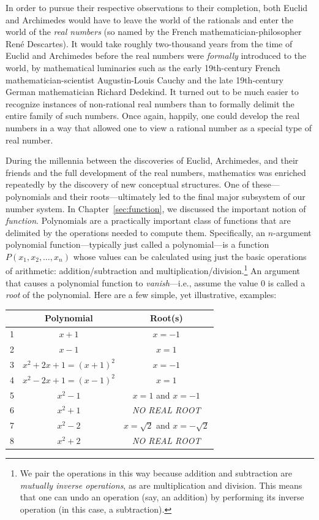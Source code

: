 In order to pursue their respective observations to their completion,
both Euclid and Archimedes would have to leave the world of the
rationals and enter the world of the {\it real numbers}
(so named by the French mathematician-philosopher Ren\'{e} Descartes).
It would take roughly two-thousand years from the time of Euclid and
Archimedes before the real numbers were {\em formally} introduced to
the world, by mathematical luminaries such as the early 19th-century
French mathematician-scientist Augustin-Louis Cauchy
and the late 19th-century German mathematician Richard Dedekind.
It turned out to be much easier to recognize instances of non-rational
real numbers than to formally delimit the entire family of such
numbers.  Once again, happily, one could develop the real numbers in a
way that allowed one to view a rational number as a special type of
real number.  

During the millennia between the discoveries of Euclid, Archimedes, and
their friends and the full development of the real numbers,
mathematics was enriched repeatedly by the discovery of new conceptual
structures.  One of these---polynomials
and their
%
roots---ultimately led to the final major subsystem of our number
system.  In Chapter~\ref{sec:function}, we discussed the important
notion of {\em function}.  Polynomials  are a
practically important class of functions that are delimited by the
operations needed to compute them.  Specifically, an $n$-argument
polynomial function---typically just called a polynomial---is a
function $P(x_1, x_2, \ldots, x_n)$ whose values can be calculated
using just the basic operations of arithmetic: addition/subtraction
and multiplication/division.\footnote{We pair the operations in this
  way because addition and subtraction are {\em mutually inverse
  operations},
 as are multiplication and division.  This means that one can undo an
 operation (say, an addition) by performing its inverse operation (in
 this case, a subtraction).}
An argument that causes a polynomial function to {\it vanish}---i.e.,
assume the value $0$ is called a {\it root} of the polynomial.
Here are a few simple, yet illustrative, examples:

\smallskip

\begin{tabular}{|c|c|c|}
\hline
 & Polynomial & Root(s) \\
\hline
1 &
$x+1$  &  $x= -1$ \\
2 &
$x-1$  &  $x= 1$ \\
3 &
$x^2 + 2x +1 = (x+1)^2$ & $x = -1$ \\ 
4 &
$x^2 - 2x +1 = (x-1)^2$ & $x = 1$ \\ 
5 &
$x^2 - 1$ & $x = 1$ and $x= -1$ \\
6 &
$x^2 + 1$ & {\em NO REAL ROOT} \\
7 &
$x^2 -2$  & $x = \sqrt{2}$ and $x = - \sqrt{2}$ \\
8 &
$x^2 + 2$ & {\em NO REAL ROOT} \\
\hline
\end{tabular}

